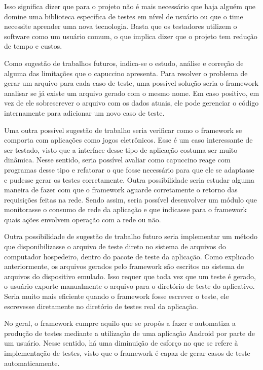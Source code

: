 \documentclass[
    12pt,       %
    openright,      %
    twoside,      %
    a4paper,      %
    english,      %
    french,       %
    spanish,      %
    brazil,       %
    ]{abntex2}
\begin{document}
      Isso significa dizer que para o projeto não é mais necessário que haja alguém que domine uma biblioteca
      específica de testes em nível de usuário ou que o time necessite aprender uma nova tecnologia. Basta
      que os testadores utilizem o software como um usuário comum, o que implica dizer que o projeto tem
      redução de tempo e custos.

      Como sugestão de trabalhos futuros, indica-se o estudo, análise e correção de alguma das limitações
      que o capuccino apresenta. Para resolver o problema de gerar um arquivo para cada caso de teste,
      uma possível solução seria o framework analisar se já existe um arquivo gerado com o mesmo nome. Em
      caso positivo, em vez de ele sobrescrever o arquivo com os dados atuais, ele pode gerenciar o código
      internamente para adicionar um novo caso de teste.

      Uma outra possível sugestão de trabalho seria verificar como o framework se comporta com aplicações
      como jogos eletrônicos. Esse é um caso interessante de ser testado, visto que a interface desse
      tipo de aplicação costuma ser muito dinâmica. Nesse sentido, seria possível avaliar como capuccino
      reage com programas desse tipo e refatorar o que fosse necessário para que ele se adaptasse e pudesse
      gerar os testes corretamente. Outra possibilidade seria estudar alguma maneira de fazer com que o
      framework aguarde corretamente o retorno das requisições feitas na rede. Sendo assim, seria possível
      desenvolver um módulo que monitorasse o consumo de rede da aplicação e que indicasse para o framework
      quais ações envolvem operação com a rede ou não.

      Outra possibilidade de sugestão de trabalho futuro seria implementar um método que disponibilizasse o
      arquivo de teste direto no sistema de arquivos do computador hospedeiro, dentro do pacote de teste
      da aplicação. Como explicado anteriormente, os arquivos gerados pelo framework são escritos no sistema
      de arquivos do dispositivo emulado. Isso requer que toda vez que um teste é gerado, o usuário exporte
      manualmente o arquivo para o diretório de teste do aplicativo. Seria muito mais eficiente quando o
      framework fosse escrever o teste, ele escrevesse diretamente no diretório de testes real da aplicação.

      No geral, o framework cumpre aquilo que se propôs a fazer e automatiza a produção de testes
      mediante a utilização de uma aplicação Android por parte de um usuário. Nesse sentido, há uma diminuição
      de esforço no que se refere à implementação de testes, visto que o framework é capaz de gerar casos de teste
      automaticamente.
\end{document}
